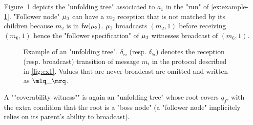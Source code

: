 \begin{example}
	Figure~\ref{fig:ex-unfolding-tree} depicts the "unfolding tree" associated to $a_1$ in the "run" of \cref{ex:example-1}. 
	"Follower node" $\mu_3$ can have a $m_2$ reception that is not matched by its children because $m_2$ is in $\mathsf{fw}(\mu_3)$. $\mu_1$ broadcasts $(m_2,1)$ before receiving $(m_6,1)$ hence the "follower specification" of $\mu_3$ witnesses broadcast of $(m_6,1)$.  
\end{example}
\begin{figure}[t]
	\begin{center}
					
		\end{center}
	\vspace*{-0.5cm}
	\caption{Example of an "unfolding tree". $\delta_{ri}$ (resp. $\delta_{bi}$) denotes the reception (resp. broadcast) transition of message $m_i$ in the protocol described in \cref{fig:ex1}. Values that are never broadcast are omitted and written as $\quotemarks{\_}$.}\label{fig:ex-unfolding-tree}
\end{figure}

A ""coverability witness"" is again an "unfolding tree" whose root covers $q_f$, with the extra condition that the root is a "boss node" (a "follower node" implicitely relies on its parent's ability to broadcast). 

